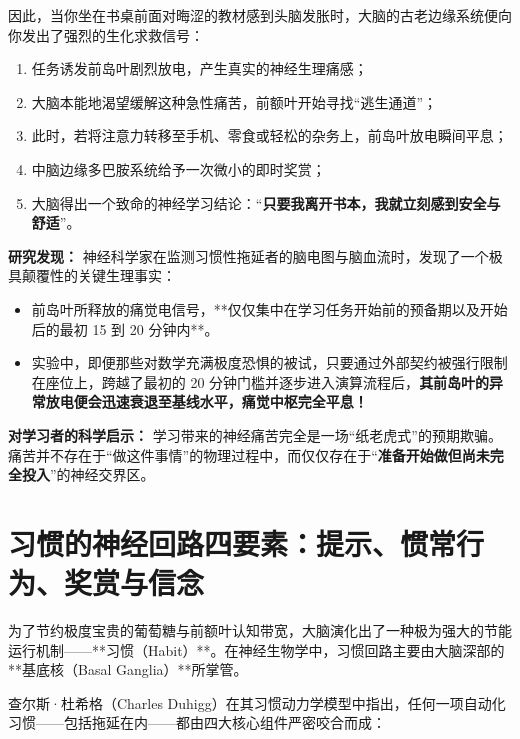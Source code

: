 \documentclass[12pt,a4paper,openany]{ctexbook}
\begin{document}
因此，当你坐在书桌前面对晦涩的教材感到头脑发胀时，大脑的古老边缘系统便向你发出了强烈的生化求救信号：
\begin{enumerate}
    \item 任务诱发前岛叶剧烈放电，产生真实的神经生理痛感；
    \item 大脑本能地渴望缓解这种急性痛苦，前额叶开始寻找“逃生通道”；
    \item 此时，若将注意力转移至手机、零食或轻松的杂务上，前岛叶放电瞬间平息；
    \item 中脑边缘多巴胺系统给予一次微小的即时奖赏；
    \item 大脑得出一个致命的神经学习结论：“\textbf{只要我离开书本，我就立刻感到安全与舒适}”。
\end{enumerate}

\begin{casebox}
\textbf{研究发现：}
神经科学家在监测习惯性拖延者的脑电图与脑血流时，发现了一个极具颠覆性的关键生理事实：
\begin{itemize}
    \item 前岛叶所释放的痛觉电信号，**仅仅集中在学习任务开始前的预备期以及开始后的最初 15 到 20 分钟内**。
    \item 实验中，即便那些对数学充满极度恐惧的被试，只要通过外部契约被强行限制在座位上，跨越了最初的 20 分钟门槛并逐步进入演算流程后，\textbf{其前岛叶的异常放电便会迅速衰退至基线水平，痛觉中枢完全平息！}
\end{itemize}

\textbf{对学习者的科学启示：}
学习带来的神经痛苦完全是一场“纸老虎式”的预期欺骗。痛苦并不存在于“做这件事情”的物理过程中，而仅仅存在于“\textbf{准备开始做但尚未完全投入}”的神经交界区。
\end{casebox}

\section{习惯的神经回路四要素：提示、惯常行为、奖赏与信念}

为了节约极度宝贵的葡萄糖与前额叶认知带宽，大脑演化出了一种极为强大的节能运行机制——**习惯（Habit）**。在神经生物学中，习惯回路主要由大脑深部的**基底核（Basal Ganglia）**所掌管。

查尔斯·杜希格（Charles Duhigg）在其习惯动力学模型中指出，任何一项自动化习惯——包括拖延在内——都由四大核心组件严密咬合而成：
\end{document}
